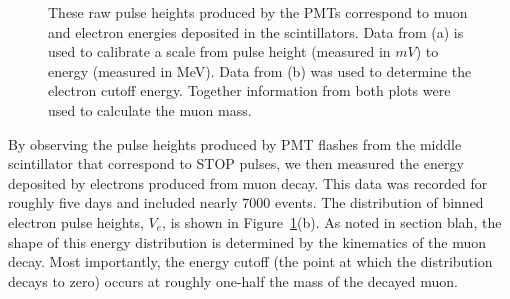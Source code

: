 \begin{figure}[htbp]
\begin{center}
\hspace{-1mm}
\vspace{-2mm}
\vspace{-2mm}
\caption{These raw pulse heights produced by the PMTs correspond to muon and electron energies deposited in the scintillators.  Data from (a) is used to calibrate a scale from pulse height (measured in $mV$) to energy (measured in MeV).  Data from (b) was used to determine the electron cutoff energy.  Together information from both plots were used to calculate the muon mass.}
\label{fig:pulseheights}
\end{center}
\end{figure}


By observing the pulse heights produced by PMT flashes from the middle
scintillator that correspond to STOP pulses, we then measured the
energy deposited by electrons produced from muon decay.  This data was
recorded for roughly five days and included nearly $7000$ events.  The
distribution of binned electron pulse heights, $V_{e}$, is shown in
Figure~\ref{fig:pulseheights}(b).  As noted in section blah, the shape of this energy
distribution is determined by the kinematics of the muon decay.  Most
importantly, the energy cutoff (the point at which the distribution
decays to zero) occurs at roughly one-half the mass of the decayed
muon.




